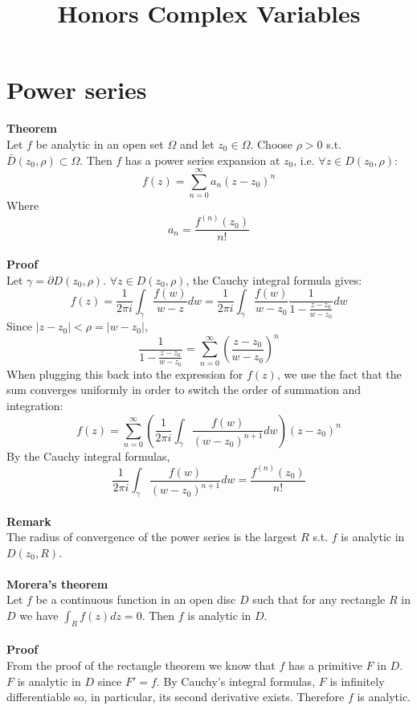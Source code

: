 \documentclass[12 pt]{article}
\title{Honors Complex Variables}
\begin{document}
  \maketitle

\section{Power series}
\textbf{Theorem}
\\
Let $f$ be analytic in an open set $\Omega$ and let $z_0\in \Omega$. Choose $\rho>0$ s.t. $\bar D(z_0,\rho)\subset \Omega$. Then $f$ has a power series expansion at $z_0$, i.e. $\forall z\in D(z_0,\rho)$:
\[ f(z) = \sum^{\infty}_{n=0} a_n (z-z_0)^n \]
Where
\[ a_n = \frac{f^{(n)}(z_0)}{n!} \]
\\
\textbf{Proof}
\\
Let $\gamma = \partial D(z_0,\rho)$. $\forall z\in D(z_0,\rho)$, the Cauchy integral formula gives:
\[ f(z) = \frac{1}{2\pi i} \int_{\gamma} \frac{f(w)}{w-z} dw =  \frac{1}{2\pi i} \int_{\gamma} \frac{f(w)}{w-z_0} \frac{1}{1-\frac{z-z_0}{w-z_0}} dw \]
Since $|z-z_0| < \rho = |w-z_0|$,
\[ \frac{1}{1-\frac{z-z_0}{w-z_0}} = \sum_{n=0}^{\infty} \left( \frac{z-z_0}{w-z_0} \right)^n \]
When plugging this back into the expression for $f(z)$, we use the fact that the sum converges uniformly in order to switch the order of summation and integration:
\[ f(z) = \sum_{n=0}^{\infty} \left(  \frac{1}{2\pi i} \int_{\gamma} \frac{f(w)}{(w-z_0)^{n+1}} dw \right) (z-z_0)^n \]
By the Cauchy integral formulas,
\[  \frac{1}{2\pi i} \int_{\gamma} \frac{f(w)}{(w-z_0)^{n+1}} dw = \frac{f^{(n)}(z_0)}{n!} \]
\\
\textbf{Remark}
\\
The radius of convergence of the power series is the largest $R$ s.t. $f$ is analytic in $D(z_0,R)$.
\\
\\
\textbf{Morera's theorem}
\\
Let $f$ be a continuous function in an open disc $D$ such that for any rectangle $R$ in $D$ we have $\int_{R} f(z) dz = 0$. Then $f$ is analytic in $D$.
\\
\\
\textbf{Proof}
\\
From the proof of the rectangle theorem we know that $f$ has a primitive $F$ in $D$. $F$ is analytic in $D$ since $F'=f$. By Cauchy's integral formulas, $F$ is infinitely differentiable so, in particular, its second derivative exists. Therefore $f$ is analytic.
\\
\end{document}
